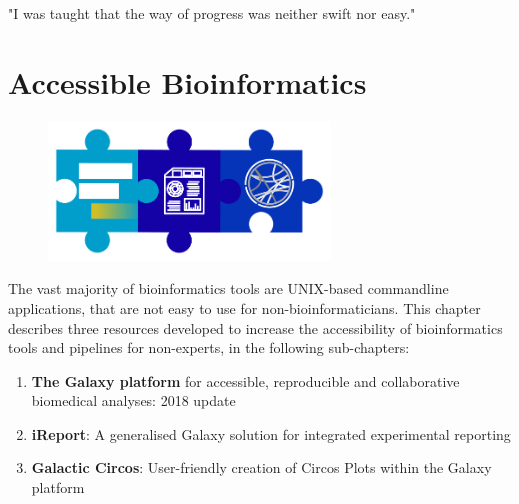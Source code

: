 \begin{savequote}[75mm]
"I was taught that the way of progress was neither swift nor easy."
\end{savequote}

\chapter{Accessible Bioinformatics}\label{chapter:general}
\setcounter{figure}{-1}
\setcounter{table}{-1}
\setcounter{section}{-1}
\setcounter{NAT@ctr}{-1}

\begin{figure}[t!]
\includegraphics[height=10em]{frontmatter/images/chapter-header-1.png}
\end{figure}
\setcounter{figure}{-1}
\setcounter{table}{-1}
\setcounter{section}{-1}

The vast majority of bioinformatics tools are UNIX-based commandline applications, that are not easy to use for non-bioinformaticians. This chapter describes three resources developed to increase the accessibility of bioinformatics tools and pipelines for non-experts, in the following sub-chapters:

\begin{enumerate}
\itemsep-0.5em
\item \textbf{The Galaxy platform} for accessible, reproducible and collaborative biomedical analyses: 2018 update
\item \textbf{iReport}: A generalised Galaxy solution for integrated experimental reporting
\item \textbf{Galactic Circos}: User-friendly creation of Circos Plots within the Galaxy platform
\end{enumerate}

